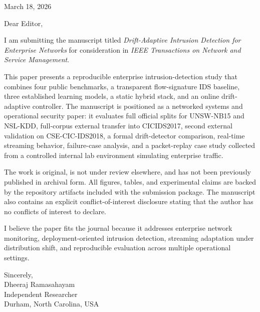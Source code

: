 \documentclass[11pt]{article}
\begin{document}
\noindent March 18, 2026

\vspace{1em}

\noindent Dear Editor,

\vspace{1em}

I am submitting the manuscript titled \textit{Drift-Adaptive Intrusion Detection for Enterprise Networks} for consideration in \textit{IEEE Transactions on Network and Service Management}.

This paper presents a reproducible enterprise intrusion-detection study that combines four public benchmarks, a transparent flow-signature IDS baseline, three established learning models, a static hybrid stack, and an online drift-adaptive controller. The manuscript is positioned as a networked systems and operational security paper: it evaluates full official splits for UNSW-NB15 and NSL-KDD, full-corpus external transfer into CICIDS2017, second external validation on CSE-CIC-IDS2018, a formal drift-detector comparison, real-time streaming behavior, failure-case analysis, and a packet-replay case study collected from a controlled internal lab environment simulating enterprise traffic.

The work is original, is not under review elsewhere, and has not been previously published in archival form. All figures, tables, and experimental claims are backed by the repository artifacts included with the submission package. The manuscript also contains an explicit conflict-of-interest disclosure stating that the author has no conflicts of interest to declare.

I believe the paper fits the journal because it addresses enterprise network monitoring, deployment-oriented intrusion detection, streaming adaptation under distribution shift, and reproducible evaluation across multiple operational settings.

\vspace{1em}

\noindent Sincerely,\\[1em]
Dheeraj Ramasahayam\\
Independent Researcher\\
Durham, North Carolina, USA
\end{document}
